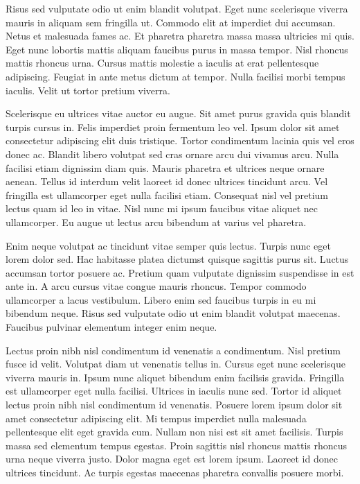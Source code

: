 \documentclass[11pt,a4paper]{article}
\begin{document}
Risus sed vulputate odio ut enim blandit volutpat. Eget nunc scelerisque viverra mauris in aliquam sem fringilla ut. Commodo elit at imperdiet dui accumsan. Netus et malesuada fames ac. Et pharetra pharetra massa massa ultricies mi quis. Eget nunc lobortis mattis aliquam faucibus purus in massa tempor. Nisl rhoncus mattis rhoncus urna. Cursus mattis molestie a iaculis at erat pellentesque adipiscing. Feugiat in ante metus dictum at tempor. Nulla facilisi morbi tempus iaculis. Velit ut tortor pretium viverra.

Scelerisque eu ultrices vitae auctor eu augue. Sit amet purus gravida quis blandit turpis cursus in. Felis imperdiet proin fermentum leo vel. Ipsum dolor sit amet consectetur adipiscing elit duis tristique. Tortor condimentum lacinia quis vel eros donec ac. Blandit libero volutpat sed cras ornare arcu dui vivamus arcu. Nulla facilisi etiam dignissim diam quis. Mauris pharetra et ultrices neque ornare aenean. Tellus id interdum velit laoreet id donec ultrices tincidunt arcu. Vel fringilla est ullamcorper eget nulla facilisi etiam. Consequat nisl vel pretium lectus quam id leo in vitae. Nisl nunc mi ipsum faucibus vitae aliquet nec ullamcorper. Eu augue ut lectus arcu bibendum at varius vel pharetra.

Enim neque volutpat ac tincidunt vitae semper quis lectus. Turpis nunc eget lorem dolor sed. Hac habitasse platea dictumst quisque sagittis purus sit. Luctus accumsan tortor posuere ac. Pretium quam vulputate dignissim suspendisse in est ante in. A arcu cursus vitae congue mauris rhoncus. Tempor commodo ullamcorper a lacus vestibulum. Libero enim sed faucibus turpis in eu mi bibendum neque. Risus sed vulputate odio ut enim blandit volutpat maecenas. Faucibus pulvinar elementum integer enim neque.

Lectus proin nibh nisl condimentum id venenatis a condimentum. Nisl pretium fusce id velit. Volutpat diam ut venenatis tellus in. Cursus eget nunc scelerisque viverra mauris in. Ipsum nunc aliquet bibendum enim facilisis gravida. Fringilla est ullamcorper eget nulla facilisi. Ultrices in iaculis nunc sed. Tortor id aliquet lectus proin nibh nisl condimentum id venenatis. Posuere lorem ipsum dolor sit amet consectetur adipiscing elit. Mi tempus imperdiet nulla malesuada pellentesque elit eget gravida cum. Nullam non nisi est sit amet facilisis. Turpis massa sed elementum tempus egestas. Proin sagittis nisl rhoncus mattis rhoncus urna neque viverra justo. Dolor magna eget est lorem ipsum. Laoreet id donec ultrices tincidunt. Ac turpis egestas maecenas pharetra convallis posuere morbi.
\end{document}
